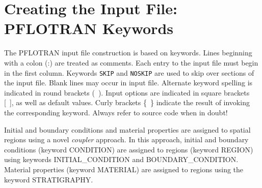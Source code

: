 \documentclass[12pt]{article}
\begin{document}

\newpage



\newpage
\section{Creating the Input File: PFLOTRAN Keywords}

\setcounter{equation}{0}

The PFLOTRAN input file construction is based on keywords. Lines beginning with a colon (:) are treated as comments. Each entry to the input file must begin in the first column. Keywords {\tt SKIP} and {\tt NOSKIP} are used to skip over sections of the input file. Blank lines may occur in input file. Alternate keyword spelling is indicated in round brackets (~). Input options are indicated in square brackets [~], as well as default values. Curly brackets \{~\} indicate the result of invoking the corresponding keyword. Always refer to source code when in doubt!

Initial and boundary conditions and material properties are assigned to spatial regions using a novel {\em coupler} approach. In this approach, initial and boundary conditions (keyword CONDITION) are assigned to regions (keyword REGION) using keywords INITIAL\_CONDITION and BOUNDARY\_CONDITION. Material properties (keyword MATERIAL) are assigned to regions using the keyword STRATIGRAPHY.
\end{document}
